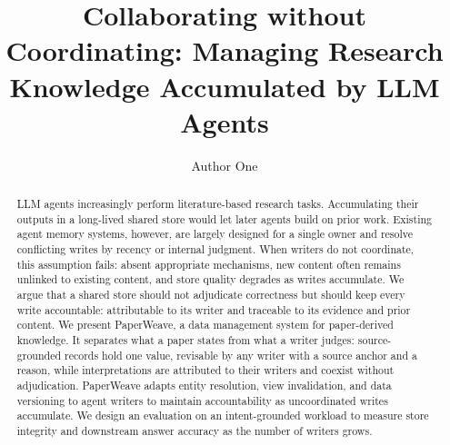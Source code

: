 \documentclass[sigconf,review,anonymous]{acmart}
\begin{document}
\title{Collaborating without Coordinating: Managing Research Knowledge Accumulated by LLM Agents}

\author{Author One}

\renewcommand{\shortauthors}{Anonymous et al.}

\begin{abstract}
LLM agents increasingly perform literature-based research tasks. Accumulating
their outputs in a long-lived shared store would let later agents build on
prior work. Existing agent memory systems, however, are largely designed for a
single owner and resolve conflicting writes by recency or internal judgment.
When writers do not coordinate, this assumption fails: absent appropriate
mechanisms, new content often remains unlinked to existing content, and store
quality degrades as writes accumulate. We argue that a shared store should not
adjudicate correctness but should keep every write accountable: attributable to
its writer and traceable to its evidence and prior content. We present
PaperWeave, a data management system for paper-derived knowledge. It separates
what a paper states from what a writer judges: source-grounded records hold one
value, revisable by any writer with a source anchor and a reason, while
interpretations are attributed to their writers and coexist without
adjudication. PaperWeave adapts entity resolution, view invalidation, and data
versioning to agent writers to maintain accountability as uncoordinated writes
accumulate. We design an evaluation on an intent-grounded workload to measure
store integrity and downstream answer accuracy as the number of writers grows.
\end{abstract}


\maketitle
\end{document}
